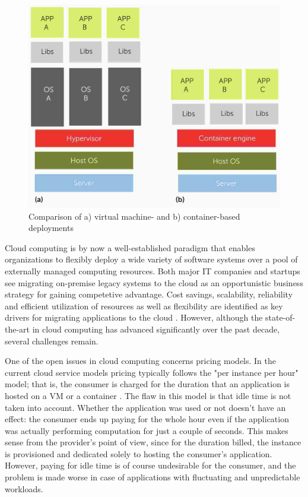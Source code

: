 \documentclass[utf8,english]{gradu3}
\begin{document}
\begin{figure}[h]
  \centering
  \includegraphics[width=\textwidth]{bernstein14-vm-vs-container.jpg}
  \caption{Comparison of a) virtual machine- and b) container-based deployments \parencite{bernstein14containers}}
  \label{fig:vmVsContainer}
\end{figure}

Cloud computing is by now a well-established paradigm that enables organizations to flexibly deploy a wide variety of software systems over a pool of externally managed computing resources. Both major IT companies and startups see migrating on-premise legacy systems to the cloud as an opportunistic business strategy for gaining competetive advantage. Cost savings, scalability, reliability and efficient utilization of resources as well as flexibility are identified as key drivers for migrating applications to the cloud \parencite{jamshidi13cloudmigrationreview}. However, although the state-of-the-art in cloud computing has advanced significantly over the past decade, several challenges remain.

One of the open issues in cloud computing concerns pricing models. In the current cloud service models pricing typically follows the "per instance per hour" model; that is, the consumer is charged for the duration that an application is hosted on a VM or a container \parencite{varghese18next}. The flaw in this model is that idle time is not taken into account. Whether the application was used or not doesn't have an effect: the consumer ends up paying for the whole hour even if the application was actually performing computation for just a couple of seconds. This makes sense from the provider's point of view, since for the duration billed, the instance is provisioned and dedicated solely to hosting the consumer's application. However, paying for idle time is of course undesirable for the consumer, and the problem is made worse in case of applications with fluctuating and unpredictable workloads.
\end{document}
